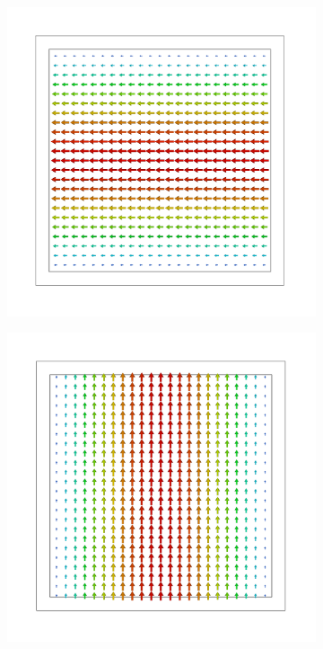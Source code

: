 \documentclass[11pt,a4paper,twoside,openany]{report}
\begin{document}
\begin{figure}
    \centering
    \begin{subfigure}{.45\textwidth}
        \centering
        \includegraphics[width=.75\textwidth]{src/waveguide_square_mode1.png}
        \caption{\label{fig:square-waveguide-mode1}}
    \end{subfigure}
    \hspace{0.5cm}
    \begin{subfigure}{.45\textwidth}
        \centering
        \includegraphics[width=.75\textwidth]{src/waveguide_square_mode2.png}
        \caption{\label{fig:square-waveguide-mode2}}
    \end{subfigure}
    \\

\end{figure}
\end{document}
